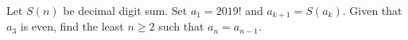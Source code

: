 Let $S(n)$ be decimal digit sum. Set $a_1=2019!$ and $a_{k+1}=S(a_k)$. Given that $a_3$ is even, find the least $n\ge2$ such that $a_n=a_{n-1}$.
